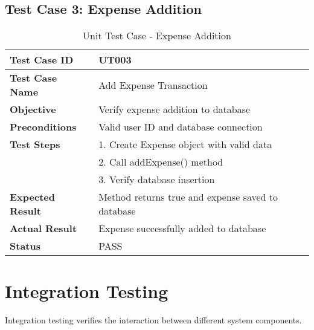 \subsection{Test Case 3: Expense Addition}
\begin{table}[h]
\centering
\begin{tabular}{|p{3cm}|p{10cm}|}
\hline
\textbf{Test Case ID} & UT003 \\
\hline
\textbf{Test Case Name} & Add Expense Transaction \\
\hline
\textbf{Objective} & Verify expense addition to database \\
\hline
\textbf{Preconditions} & Valid user ID and database connection \\
\hline
\textbf{Test Steps} & 1. Create Expense object with valid data\\
& 2. Call addExpense() method\\
& 3. Verify database insertion \\
\hline
\textbf{Expected Result} & Method returns true and expense saved to database \\
\hline
\textbf{Actual Result} & Expense successfully added to database \\
\hline
\textbf{Status} & PASS \\
\hline
\end{tabular}
\caption{Unit Test Case - Expense Addition}
\end{table}

\section{Integration Testing}

Integration testing verifies the interaction between different system components.

